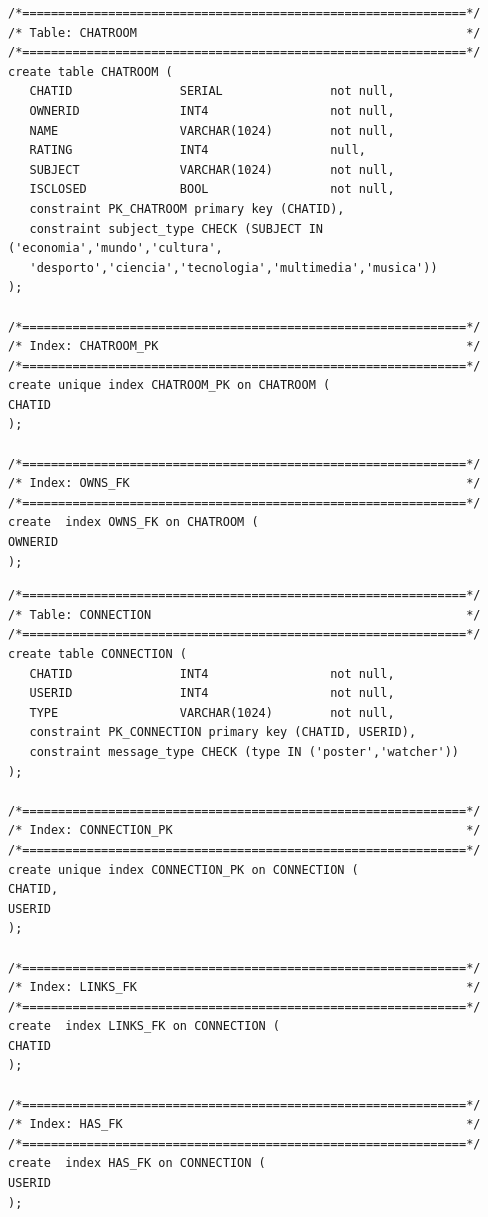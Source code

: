 \documentclass[a4paper, 12pt]{article}
\begin{document}
\cleardoublepage
\begin{verbatim}
/*==============================================================*/
/* Table: CHATROOM                                              */
/*==============================================================*/
create table CHATROOM (
   CHATID               SERIAL               not null,
   OWNERID              INT4                 not null,
   NAME                 VARCHAR(1024)        not null,
   RATING               INT4                 null,
   SUBJECT              VARCHAR(1024)        not null,
   ISCLOSED             BOOL                 not null,
   constraint PK_CHATROOM primary key (CHATID),
   constraint subject_type CHECK (SUBJECT IN ('economia','mundo','cultura',
   'desporto','ciencia','tecnologia','multimedia','musica'))
);

/*==============================================================*/
/* Index: CHATROOM_PK                                           */
/*==============================================================*/
create unique index CHATROOM_PK on CHATROOM (
CHATID
);

/*==============================================================*/
/* Index: OWNS_FK                                               */
/*==============================================================*/
create  index OWNS_FK on CHATROOM (
OWNERID
);
\end{verbatim}
\cleardoublepage
\begin{verbatim}
/*==============================================================*/
/* Table: CONNECTION                                            */
/*==============================================================*/
create table CONNECTION (
   CHATID               INT4                 not null,
   USERID               INT4                 not null,
   TYPE                 VARCHAR(1024)        not null,
   constraint PK_CONNECTION primary key (CHATID, USERID),
   constraint message_type CHECK (type IN ('poster','watcher'))
);

/*==============================================================*/
/* Index: CONNECTION_PK                                         */
/*==============================================================*/
create unique index CONNECTION_PK on CONNECTION (
CHATID,
USERID
);

/*==============================================================*/
/* Index: LINKS_FK                                              */
/*==============================================================*/
create  index LINKS_FK on CONNECTION (
CHATID
);

/*==============================================================*/
/* Index: HAS_FK                                                */
/*==============================================================*/
create  index HAS_FK on CONNECTION (
USERID
);
\end{verbatim}
\end{document}
